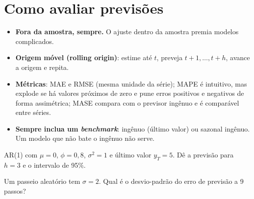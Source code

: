\section{Como avaliar previsões}
\begin{itemize}[leftmargin=1.4em]
\item \textbf{Fora da amostra, sempre.} O ajuste dentro da amostra premia modelos complicados.
\item \textbf{Origem móvel (rolling origin)}: estime até $t$, preveja $t+1,\dots,t+h$, avance a origem e repita.
\item \textbf{Métricas}: MAE e RMSE (mesma unidade da série); MAPE é intuitivo, mas explode se há valores próximos de zero e pune erros positivos e negativos de forma assimétrica; MASE compara com o previsor ingênuo e é comparável entre séries.
\item \textbf{Sempre inclua um \emph{benchmark}}: ingênuo (último valor) ou sazonal ingênuo. Um modelo que não bate o ingênuo não serve.
\end{itemize}

\begin{exercicio}
AR(1) com $\mu=0$, $\phi=0{,}8$, $\sigma^2=1$ e último valor $y_T=5$. Dê a previsão para $h=3$ e o intervalo de 95\%.
\end{exercicio}

\begin{exercicio}
Um passeio aleatório tem $\sigma=2$. Qual é o desvio-padrão do erro de previsão a 9 passos?
\end{exercicio}
